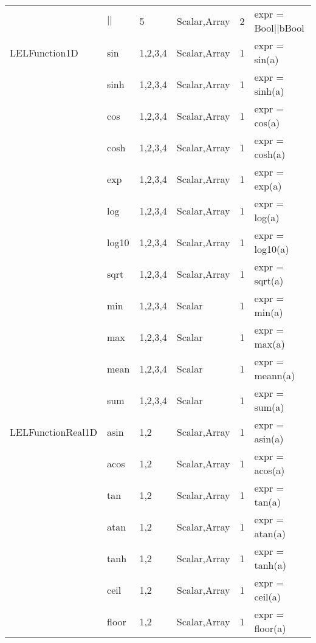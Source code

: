 \begin{center}
\begin{tabular}{|l|l|l|l|l|l}
                 &     $||$       &   5          &   Scalar,Array   &   2   &   expr = Bool$||$bBool \\
LELFunction1D &        sin      &   1,2,3,4    &   Scalar,Array   &   1   &   expr = sin(a) \\  
               &       sinh     &   1,2,3,4    &   Scalar,Array   &   1   &   expr = sinh(a) \\ 
                &      cos      &   1,2,3,4    &   Scalar,Array   &   1   &   expr = cos(a) \\  
                 &     cosh     &   1,2,3,4    &   Scalar,Array   &   1   &   expr = cosh(a) \\   
                  &    exp      &   1,2,3,4    &   Scalar,Array   &   1   &   expr = exp(a) \\   
              &        log      &   1,2,3,4    &   Scalar,Array   &   1   &   expr = log(a) \\
               &       log10    &   1,2,3,4    &   Scalar,Array   &   1   &   expr = log10(a) \\
                &      sqrt     &   1,2,3,4    &   Scalar,Array   &   1   &   expr = sqrt(a) \\
                 &     min      &   1,2,3,4    &   Scalar         &   1   &   expr = min(a) \\
              &        max      &   1,2,3,4    &   Scalar         &   1   &   expr = max(a) \\
               &       mean     &   1,2,3,4    &   Scalar         &   1   &   expr = meann(a) \\
                &      sum      &   1,2,3,4    &   Scalar         &   1   &   expr = sum(a) \\
LELFunctionReal1D &    asin     &   1,2        &   Scalar,Array   &   1   &   expr = asin(a) \\
                  &    acos     &   1,2        &   Scalar,Array   &   1   &   expr = acos(a) \\
                  &    tan      &   1,2        &   Scalar,Array   &   1   &   expr = tan(a) \\
                  &    atan     &   1,2        &   Scalar,Array   &   1   &   expr = atan(a) \\
                  &    tanh     &   1,2        &   Scalar,Array   &   1   &   expr = tanh(a) \\
                  &    ceil     &   1,2        &   Scalar,Array   &   1   &   expr = ceil(a) \\
                  &    floor    &   1,2        &   Scalar,Array   &   1   &   expr = floor(a) \\

\end{tabular}
\end{center}
